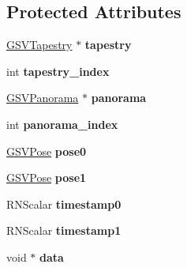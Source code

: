 \subsection*{Protected Attributes}
\begin{DoxyCompactItemize}
\item 
\hyperlink{class_g_s_v_tapestry}{G\+S\+V\+Tapestry} $\ast$ {\bfseries tapestry}\hypertarget{class_g_s_v_image_ac2ff8fae3825668bb4faac84fa09d67d}{}\label{class_g_s_v_image_ac2ff8fae3825668bb4faac84fa09d67d}

\item 
int {\bfseries tapestry\+\_\+index}\hypertarget{class_g_s_v_image_ae5d6d580da63dc30459bc3755d5ebfd2}{}\label{class_g_s_v_image_ae5d6d580da63dc30459bc3755d5ebfd2}

\item 
\hyperlink{class_g_s_v_panorama}{G\+S\+V\+Panorama} $\ast$ {\bfseries panorama}\hypertarget{class_g_s_v_image_a4fc478936b668d366aa7c70e61cab7ef}{}\label{class_g_s_v_image_a4fc478936b668d366aa7c70e61cab7ef}

\item 
int {\bfseries panorama\+\_\+index}\hypertarget{class_g_s_v_image_a1ff1aced36b14f7560fc86275c1a985c}{}\label{class_g_s_v_image_a1ff1aced36b14f7560fc86275c1a985c}

\item 
\hyperlink{class_g_s_v_pose}{G\+S\+V\+Pose} {\bfseries pose0}\hypertarget{class_g_s_v_image_ae4b853d2dde9d3c3553d27301e34b700}{}\label{class_g_s_v_image_ae4b853d2dde9d3c3553d27301e34b700}

\item 
\hyperlink{class_g_s_v_pose}{G\+S\+V\+Pose} {\bfseries pose1}\hypertarget{class_g_s_v_image_a9a253984c8612182ebd0d7446a44c687}{}\label{class_g_s_v_image_a9a253984c8612182ebd0d7446a44c687}

\item 
R\+N\+Scalar {\bfseries timestamp0}\hypertarget{class_g_s_v_image_a6505398643695bf2602cc1d7246e036b}{}\label{class_g_s_v_image_a6505398643695bf2602cc1d7246e036b}

\item 
R\+N\+Scalar {\bfseries timestamp1}\hypertarget{class_g_s_v_image_aa2db25548ecb441e40fb34291327ac75}{}\label{class_g_s_v_image_aa2db25548ecb441e40fb34291327ac75}

\item 
void $\ast$ {\bfseries data}\hypertarget{class_g_s_v_image_af3fc1d5d47ebd1ad6d6d34217487ff25}{}\label{class_g_s_v_image_af3fc1d5d47ebd1ad6d6d34217487ff25}

\end{DoxyCompactItemize}
